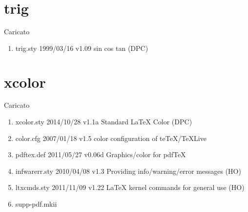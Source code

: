 \section{trig}	 	 

Caricato 
\begin{enumerate}
	\item trig.sty 1999/03/16 v1.09 sin cos tan (DPC)
\end{enumerate}	
\section{xcolor}

Caricato 
\begin{enumerate}
\item xcolor.sty 2014/10/28 v1.1a Standard LaTeX Color (DPC)
\item color.cfg 2007/01/18 v1.5 color configuration of teTeX/TeXLive
\item pdftex.def 2011/05/27 v0.06d Graphics/color for pdfTeX
\item infwarerr.sty 2010/04/08 v1.3 Providing info/warning/error messages (HO)
\item ltxcmds.sty 2011/11/09 v1.22 LaTeX kernel commands for general use (HO)
\item supp-pdf.mkii
\end{enumerate}		 